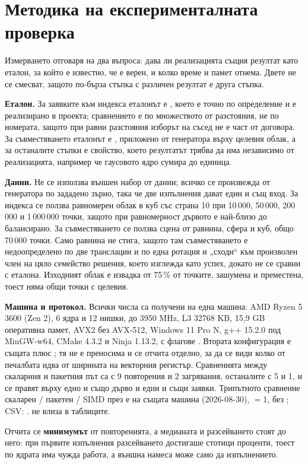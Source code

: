 \section{Методика на експерименталната проверка}
\label{sec:method}

Измерването отговаря на два въпроса: дава ли реализацията същия резултат като еталон, за който
е известно, че е верен, и колко време и памет отнема. Двете не се смесват, защото по-бърза
стъпка с различен резултат е друга стъпка.

\textbf{Еталон.} За заявките към индекса еталонът е , което е
точно по определение и е реализирано в проекта; сравнението е по множеството от разстояния, не
по номерата, защото при равни разстояния изборът на съсед не е част от договора. За
съвместяването еталонът е , приложено от генератора върху целевия
облак, а за останалите стъпки е свойство, което резултатът трябва да има независимо от
реализацията, например че гаусовото ядро сумира до единица.

\textbf{Данни.} Не се използва външен набор от данни; всичко се произвежда от генератора по
зададено зърно, така че две изпълнения дават един и същ вход. За индекса се ползва равномерен
облак в куб със страна 10 при 10\,000, 50\,000, 200\,000 и 1\,000\,000 точки, защото при
равномерност дървото е най-близо до балансирано. За съвместяването се ползва сцена от равнина,
сфера и куб, общо 70\,000 точки. Само равнина не стига, защото там
съвместяването е недоопределено по две транслации и по една ротация и „сходи“ към произволен
член на цяло семейство решения, което изглежда като успех, докато не се сравни с еталона.
Изходният облак е извадка от 75\,\% от точките, зашумена и преместена, тоест няма общи точки с
целевия.

\textbf{Машина и протокол.} Всички числа са получени на една машина: AMD Ryzen 5 3600 (Zen 2),
6 ядра и 12 нишки, до 3950 MHz, L3 32768 KB, 15,9 GB оперативна памет, AVX2 без AVX-512,
Windows 11 Pro N, g++ 15.2.0 под MinGW-w64, CMake 4.3.2 и Ninja 1.13.2, с флагове
. Втората конфигурация е същата плюс ; тя
не е преносима и се отчита отделно, за да се види колко от печалбата идва от ширината на
векторния регистър. Сравненията между скаларния и пакетния път са с 9 повторения и 2 загрявания,
останалите с 5 и 1, и се правят върху едно и също дърво и едни и същи заявки.
Трипътното сравнение скаларен / пакетен / SIMD през  е на същата машина
(2026-08-30), ${}={}$1, без
; CSV: .
 не влиза в таблиците.

Отчита се \textbf{минимумът} от повторенията, а медианата и разсейването стоят до него: при
първите изпълнения разсейването достигаше стотици проценти, тоест по ядрата има чужда работа, а
външна намеса може само да  изпълнението.
